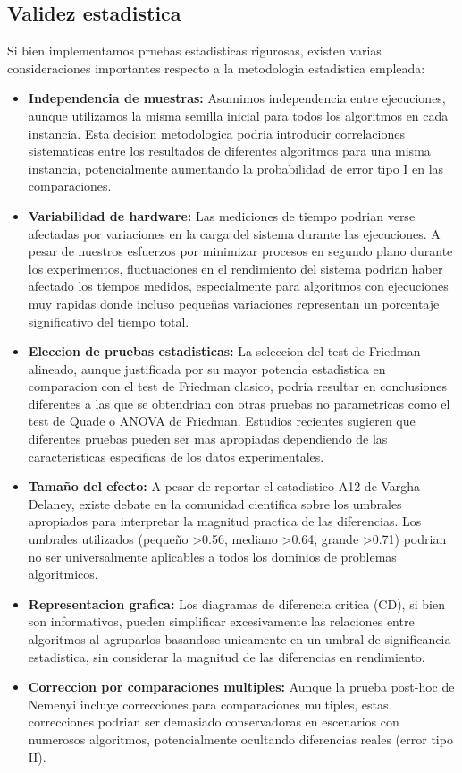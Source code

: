 \documentclass[conference,a4paper]{IEEEtran}
\begin{document}
\subsection{Validez estadistica}

Si bien implementamos pruebas estadisticas rigurosas, existen varias consideraciones importantes respecto a la metodologia estadistica empleada:

\begin{itemize}
\item \textbf{Independencia de muestras:} Asumimos independencia entre ejecuciones, aunque utilizamos la misma semilla inicial para todos los algoritmos en cada instancia. Esta decision metodologica podria introducir correlaciones sistematicas entre los resultados de diferentes algoritmos para una misma instancia, potencialmente aumentando la probabilidad de error tipo I en las comparaciones.

\item \textbf{Variabilidad de hardware:} Las mediciones de tiempo podrian verse afectadas por variaciones en la carga del sistema durante las ejecuciones. A pesar de nuestros esfuerzos por minimizar procesos en segundo plano durante los experimentos, fluctuaciones en el rendimiento del sistema podrian haber afectado los tiempos medidos, especialmente para algoritmos con ejecuciones muy rapidas donde incluso pequeñas variaciones representan un porcentaje significativo del tiempo total.

\item \textbf{Eleccion de pruebas estadisticas:} La seleccion del test de Friedman alineado, aunque justificada por su mayor potencia estadistica en comparacion con el test de Friedman clasico, podria resultar en conclusiones diferentes a las que se obtendrian con otras pruebas no parametricas como el test de Quade o ANOVA de Friedman. Estudios recientes sugieren que diferentes pruebas pueden ser mas apropiadas dependiendo de las caracteristicas especificas de los datos experimentales.

\item \textbf{Tamaño del efecto:} A pesar de reportar el estadistico A12 de Vargha-Delaney, existe debate en la comunidad cientifica sobre los umbrales apropiados para interpretar la magnitud practica de las diferencias. Los umbrales utilizados (pequeño >0.56, mediano >0.64, grande >0.71) podrian no ser universalmente aplicables a todos los dominios de problemas algoritmicos.

\item \textbf{Representacion grafica:} Los diagramas de diferencia critica (CD), si bien son informativos, pueden simplificar excesivamente las relaciones entre algoritmos al agruparlos basandose unicamente en un umbral de significancia estadistica, sin considerar la magnitud de las diferencias en rendimiento.

\item \textbf{Correccion por comparaciones multiples:} Aunque la prueba post-hoc de Nemenyi incluye correcciones para comparaciones multiples, estas correcciones podrian ser demasiado conservadoras en escenarios con numerosos algoritmos, potencialmente ocultando diferencias reales (error tipo II).
\end{itemize}
\end{document}
